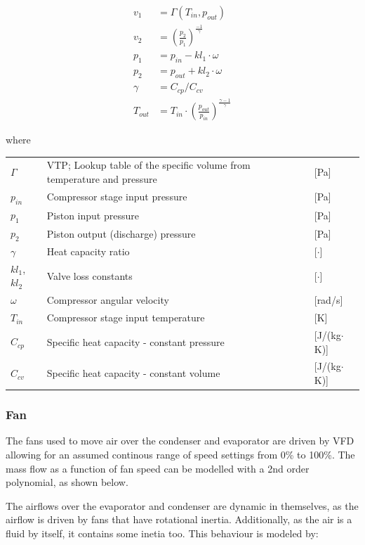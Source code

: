 \begin{align}
	v_1 &= \Gamma(T_{in},p_{out}) \\
	v_2 &= \left(\frac{p_2}{p_1}\right)^{\frac{-1}{\gamma}} \\
	p_1 &= p_{in} - kl_1 \cdot \omega \\
	p_2 &= p_{out} + kl_2 \cdot \omega \\
	\gamma &= C_{cp}/C_{cv} \\
	T_{out} &= T_{in}\cdot \left(\frac{p_{out}}{p_{in}}\right)^{\frac{\gamma-1}{\gamma}}
\end{align}

where

\begin{center}
	\begin{tabular}{l p{8cm} l}
		$\Gamma$				& VTP; Lookup table of the specific volume from temperature and pressure		& [\si{Pa}]\\
		$p_{in}$				& Compressor stage input pressure 			& [\si{Pa}]\\
		$p_1$					& Piston input pressure									& [\si{Pa}]\\
		$p_2$					& Piston output (discharge) pressure 		& [\si{Pa}]\\
		$\gamma$				& Heat capacity ratio 								& [$ \cdot $]\\
		$ kl_1$, $kl_2$			& Valve loss constants							& [$ \cdot $]\\
		$\omega$ 				& Compressor angular velocity 				& [\si{rad}/\si{s}]\\
		$T_{in}$ 				& Compressor stage input temperature 	& [\si{K}]\\
		$C_{cp}$ 				& Specific heat capacity - constant pressure 	& [\si{J}/(\si{kg}$ \cdot $\si{K})]\\
		$C_{cv} $ 				& Specific heat capacity - constant volume 	& [\si{J}/(\si{kg}$ \cdot $\si{K})]\\
	\end{tabular}
\end{center}


\subsubsection{Fan}
The fans used to move air over the condenser and evaporator are driven by VFD allowing for an assumed continous range of speed settings from 0\% to 100\%. The mass flow as a function of fan speed can be modelled with a 2nd order polynomial, as shown below.

The airflows over the evaporator and condenser are dynamic in themselves, as the airflow is driven by fans that have rotational inertia. Additionally, as the air is a fluid by itself, it contains some inetia too. This behaviour is modeled by:

